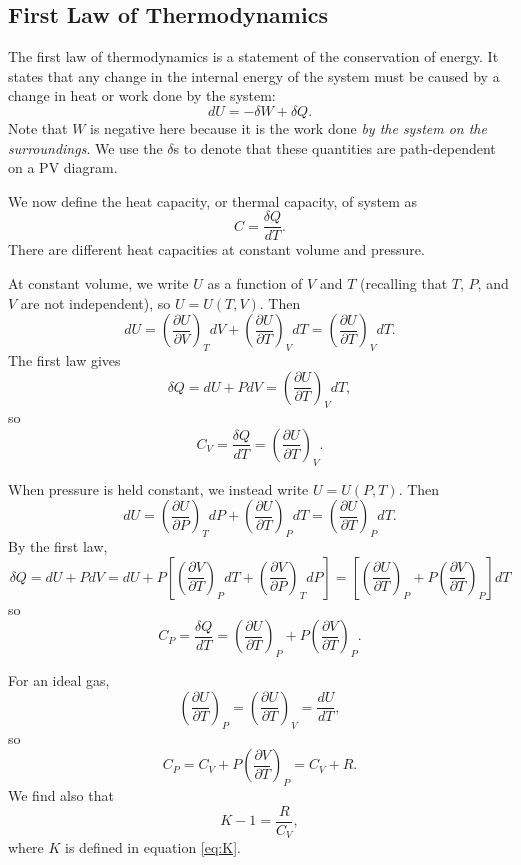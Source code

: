 \subsection{First Law of Thermodynamics}
The first law of thermodynamics is a statement of the conservation of energy. It states that any change in the internal energy of the system must be caused by a change in heat or work done by the system: $$dU = -\delta W + \delta Q.$$ Note that $W$ is negative here because it is the work done \textit{by the system on the surroundings}. We use the $\delta$s to denote that these quantities are path-dependent on a PV diagram.

We now define the heat capacity, or thermal capacity, of system as $$C = \frac{\delta Q}{dT}.$$  There are different heat capacities at constant volume and pressure.

At constant volume, we write $U$ as a function of $V$ and $T$ (recalling that $T$, $P$, and $V$ are not independent), so $U = U(T,V)$. Then $$dU = \left(\frac{\partial U}{\partial V}  \right)_T dV + \left(\frac{\partial U}{\partial T}  \right)_V dT =\left(\frac{\partial U}{\partial T}  \right)_V dT .$$ The first law gives $$\delta Q = dU + P dV =\left(\frac{\partial U}{\partial T}  \right)_V dT,$$ so $$C_V = \frac{\delta Q}{dT} = \left(\frac{\partial U}{\partial T}  \right)_V.$$

When pressure is held constant, we instead write $U = U(P,T).$ Then  $$dU = \left(\frac{\partial U}{\partial P}  \right)_T dP + \left(\frac{\partial U}{\partial T}  \right)_P dT =\left(\frac{\partial U}{\partial T}  \right)_P dT .$$ By the first law,
$$\delta Q = dU + P dV = dU + P\left[\left(\frac{\partial V}{\partial T} \right)_P dT+\left(\frac{\partial V}{\partial P} \right)_T dP \right] = \left[\left(\frac{\partial U}{\partial T}  \right)_P + P \left(\frac{\partial V}{\partial T} \right)_P \right] dT$$ so $$C_P = \frac{\delta Q}{dT} = \left(\frac{\partial U}{\partial T}  \right)_P+P\left(\frac{\partial V}{\partial T} \right)_P.$$ 

For an ideal gas, $$\left(\frac{\partial U}{\partial T}  \right)_P=\left(\frac{\partial U}{\partial T}  \right)_V = \frac{dU}{dT},$$ so $$C_P = C_V + P\left(\frac{\partial V}{\partial T} \right)_P = C_V + R.$$ We find also that $$K-1 = \frac{R}{C_V},$$ where $K$ is defined in equation \ref{eq:K}.

